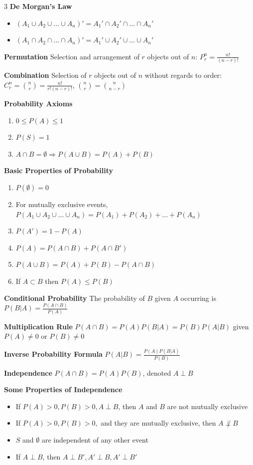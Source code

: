 \documentclass[10pt, landscape]{article}
\begin{document}
\begin{multicols*}{3}
\textbf{De Morgan's Law}
\begin{itemize}
    \item $(A_1 \cup A_2 \cup ... \cup A_n)'=A_1'\cap A_2'\cap ... \cap A_n'$
    \item $(A_1 \cap A_2 \cap ... \cap A_n)'=A_1'\cup A_2'\cup ... \cup A_n'$
\end{itemize}

\textbf{Permutation} Selection and arrangement of $r$ objects out of $n$: $P_r^n=\frac{n!}{(n-r)!}$

\textbf{Combination} Selection of $r$ objects out of $n$ without regards to order: $C_r^n={n \choose r}=\frac{n!}{r!(n-r)!}$, ${n \choose r}={n \choose n-r}$

\textbf{Probability Axioms}
\begin{enumerate}
    \item $0\leq P(A) \leq 1$
    \item $P(S)=1$
    \item $A \cap B = \emptyset \Rightarrow P(A \cup B) = P(A)+P(B)$
\end{enumerate}

\textbf{Basic Properties of Probability}
\begin{enumerate}
    \item $P(\emptyset)=0$
    \item For mutually exclusive events, $P(A_1\cup A_2 \cup... \cup A_n)=P(A_1)+P(A_2)+...+P(A_n)$
    \item $P(A')=1-P(A)$
    \item $P(A)=P(A\cap B)+P(A \cap B')$
    \item $P(A \cup B)=P(A)+P(B)-P(A \cap B)$
    \item If $A \subset B$ then $P(A)\leq P(B)$
\end{enumerate}

\textbf{Conditional Probability} The probability of $B$ given $A$ occurring is $P(B|A)=\frac{P(A\cap B)}{P(A)}$

\textbf{Multiplication Rule} $P(A\cap B)=P(A)P(B|A)=P(B)P(A|B)$ given $P(A) \neq 0$ or $P(B) \neq 0$

\textbf{Inverse Probability Formula} $P(A|B)=\frac{P(A)P(B|A)}{P(B)}$

\textbf{Independence} $P(A\cap B)=P(A)P(B)$, denoted $A \perp B$

\textbf{Some Properties of Independence}
\begin{itemize}
    \item If $P(A)>0, P(B) > 0, A \perp B$, then $A$ and $B$ are not mutually exclusive
    \item If $P(A)>0, P(B)>0,$ and they are mutually exclusive, then $A \not\perp B$
    \item $S$ and $\emptyset$ are independent of any other event
    \item If $A \perp B$, then $A \perp B', A' \perp B, A' \perp B'$
\end{itemize}


\end{multicols*}
\end{document}
